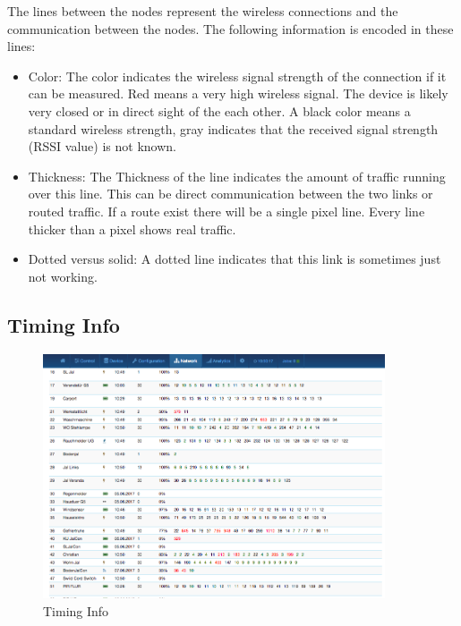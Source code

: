 The lines between the nodes represent the wireless connections and the communication between
the nodes. The following information is encoded in these lines:

\begin{itemize}
\item Color: The color indicates the wireless signal strength of the connection if it can be
measured. Red means a very high wireless signal.
The device is likely very closed or in direct sight of the each other. A black color means a
standard wireless strength, gray indicates that the received signal strength (RSSI value) 
is not known.

\item Thickness: The Thickness of the line indicates the amount of traffic running over
this line. This can be direct communication between the two links or routed traffic. If a 
route exist there will be a single pixel line. Every line thicker than a pixel shows real 
traffic.

\item Dotted versus solid: A dotted line indicates that this link is sometimes just not working.
\end{itemize}


\subsection{Timing Info}

\begin{figure}
\begin{center}
\includegraphics[width=0.9\textwidth]{pngs/cap7/eui25.png}
\caption{Timing Info}
\label{eui25}
\end{center}
\end{figure}

